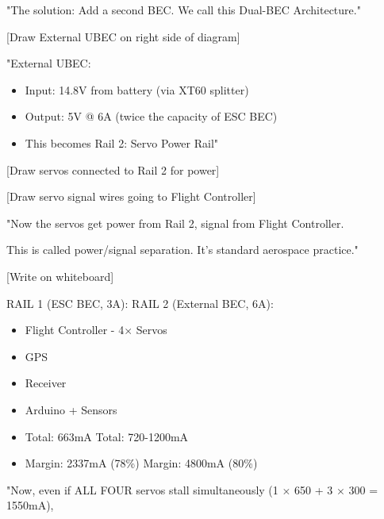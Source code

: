 \documentclass[11pt,letterpaper]{article}
\begin{document}
{"The solution: Add a second BEC. We call this Dual-BEC Architecture."\par

[Draw External UBEC on right side of diagram]\par

"External UBEC:\par

\begin{itemize}
  \item Input: 14.8V from battery (via XT60 splitter)
  \item Output: 5V @ 6A (twice the capacity of ESC BEC)
  \item This becomes Rail 2: Servo Power Rail"
\end{itemize}

[Draw servos connected to Rail 2 for power]\par

[Draw servo signal wires going to Flight Controller]\par

"Now the servos get power from Rail 2, signal from Flight Controller.\par

This is called power/signal separation. It's standard aerospace practice."\par

[Write on whiteboard]\par

RAIL 1 (ESC BEC, 3A):          RAIL 2 (External BEC, 6A):\par

\begin{itemize}
  \item Flight Controller              - 4$\times$ Servos
  \item GPS
  \item Receiver
  \item Arduino + Sensors
\end{itemize}

\begin{itemize}
  \item Total: 663mA                     Total: 720-1200mA
  \item Margin: 2337mA (78\%)             Margin: 4800mA (80\%)
\end{itemize}

"Now, even if ALL FOUR servos stall simultaneously (1 $\times$ 650 + 3 $\times$ 300 = 1550mA),\par

}
\end{document}
